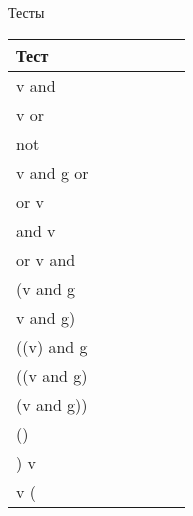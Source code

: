 \begin{para}{Тесты}
\begin{table}[h]
\begin{center}
\begin{tabular}{|p{0.5\linewidth}|}
\hline
\textbf{Тест}\\
\hline
v and\\
\hline
v or\\
\hline
not\\
\hline
v and g or\\
\hline
or v\\
\hline
and v\\
\hline
or v and\\
\hline
(v and g\\
\hline
v and g)\\
\hline
((v) and g\\
\hline
((v and g)\\
\hline
(v and g))\\
\hline
()\\
\hline
) v\\
\hline
v (\\
\hline


\end{tabular}

\end{center}

\end{table}

\end{para}

